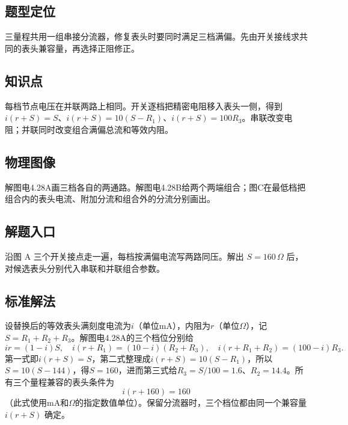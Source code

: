 \documentclass[UTF8,fontset=fandol,a4paper,11pt]{ctexart}
\begin{document}
\subsection*{题型定位}

三量程共用一组串接分流器，修复表头时要同时满足三档满偏。先由开关接线求共同的表头兼容量，再选择正阻修正。



\subsection*{知识点}

每档节点电压在并联两路上相同。开关逐档把精密电阻移入表头一侧，得到 $i(r+S)=S$、$i(r+S)=10(S-R_1)$、$i(r+S)=100R_3$。串联改变电阻；并联同时改变组合满偏总流和等效内阻。



\subsection*{物理图像}

解图电4.28A画三档各自的两通路。解图电4.28B给两个两端组合；图C在最低档把组合内的表头电流、附加分流和组合外的分流分别画出。



\subsection*{解题入口}

沿图 A 三个开关接点走一遍，每档按满偏电流写两路同压。解出 $S=160\,\Omega$ 后，对候选表头分别代入串联和并联组合参数。


\subsection*{标准解法}

设替换后的等效表头满刻度电流为$i$（单位mA），内阻为$r$（单位$\Omega$），记$S=R_1+R_2+R_3$。解图电4.28A的三个档位分别给
\[
ir=(1-i)S,\quad i(r+R_1)=(10-i)(R_2+R_3),\quad
i(r+R_1+R_2)=(100-i)R_3.
\]
第一式即$i(r+S)=S$，第二式整理成$i(r+S)=10(S-R_1)$，所以$S=10(S-144)$，得$S=160$，进而第三式给$R_3=S/100=1.6$、$R_2=14.4$。所有三个量程兼容的表头条件为
\[
\boxed{i(r+160)=160}
\]
（此式使用mA和$\Omega$的指定数值单位）。保留分流器时，三个档位都由同一个兼容量 $i(r+S)$ 确定。
\end{document}
